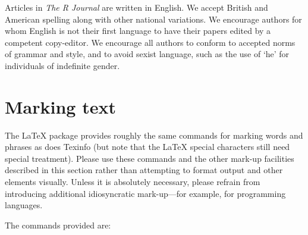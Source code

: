 Articles in \emph{The R Journal} are written in English. We accept British and American
spelling along with other national variations. We encourage authors for whom English is
not their first language to have their papers edited by a competent copy-editor. We
encourage all authors to conform to accepted norms of grammar and style, and to avoid
sexist language, such as the use of `he' for individuals of indefinite gender.

\section{Marking text}

The  \LaTeX{} package provides roughly the same commands for marking
words and phrases as does Texinfo (but note that the \LaTeX{} special
characters still need special treatment). Please use these commands and the other
mark-up facilities described in this section rather than attempting to format
output and other elements visually. Unless it is absolutely necessary, please refrain from
introducing additional idiosyncratic mark-up---for example, for programming languages.

The commands provided are:

